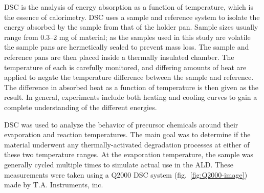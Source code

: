 DSC is the analysis of energy absorption as a function of temperature, which is the essence of calorimetry. DSC uses a sample and reference system to isolate the energy absorbed by the sample from that of the holder pan. Sample sizes usually range from 0.3--2 mg of material; as the samples used in this study are volatile the sample pans are hermetically sealed to prevent mass loss. The sample and reference pans are then placed inside a thermally insulated chamber. The temperature of each is carefully monitored, and differing amounts of heat are applied to negate the temperature difference between the sample and reference. The difference in absorbed heat as a function of temperature is then given as the result. In general, experiments include both heating and cooling curves to gain a complete understanding of the different energies. 
	
DSC was used to analyze the behavior of precursor chemicals around their evaporation and reaction temperatures. The main goal was to determine if the material underwent any thermally-activated degradation processes at either of these two temperature ranges. At the evaporation temperature, the sample was generally cycled multiple times to simulate actual use in the ALD. These measurements were taken using a Q2000 DSC system (fig.~\vref{fig:Q2000-image}) made by T.A. Instruments, inc.	
	

































	
	
	